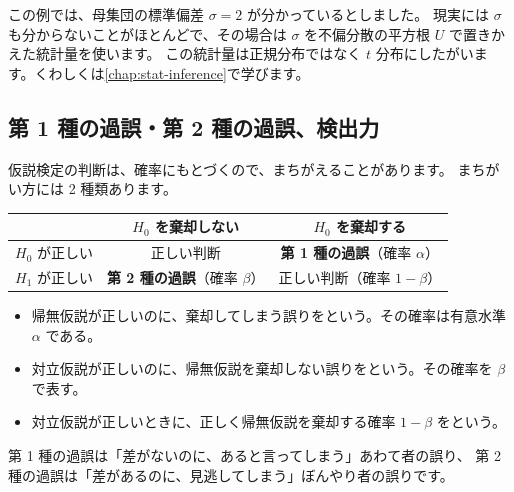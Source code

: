 \begin{supplement}[母分散が分からないとき]
  この例では、母集団の標準偏差 $\sigma = 2$ が分かっているとしました。
  現実には $\sigma$ も分からないことがほとんどで、その場合は $\sigma$ を不偏分散の平方根 $U$ で置きかえた統計量を使います。
  この統計量は正規分布ではなく $t$ 分布にしたがいます。くわしくは\cref{chap:stat-inference}で学びます。
\end{supplement}

\subsection{第 1 種の過誤・第 2 種の過誤、検出力}

仮説検定の判断は、確率にもとづくので、まちがえることがあります。
まちがい方には 2 種類あります。

\begin{center}
  \begin{tabular}{l|cc}
    \toprule
    & $H_0$ を棄却しない & $H_0$ を棄却する \\
    \midrule
    $H_0$ が正しい & 正しい判断 & \textbf{第 1 種の過誤}（確率 $\alpha$） \\
    $H_1$ が正しい & \textbf{第 2 種の過誤}（確率 $\beta$） & 正しい判断（確率 $1 - \beta$） \\
    \bottomrule
  \end{tabular}
\end{center}

\begin{definition}
  \begin{itemize}
    \item 帰無仮説が正しいのに、棄却してしまう誤りをという。その確率は有意水準 $\alpha$ である。
    \item 対立仮説が正しいのに、帰無仮説を棄却しない誤りをという。その確率を $\beta$ で表す。
    \item 対立仮説が正しいときに、正しく帰無仮説を棄却する確率 $1 - \beta$ をという。
  \end{itemize}
\end{definition}

第 1 種の過誤は「差がないのに、あると言ってしまう」あわて者の誤り、
第 2 種の過誤は「差があるのに、見逃してしまう」ぼんやり者の誤りです。

